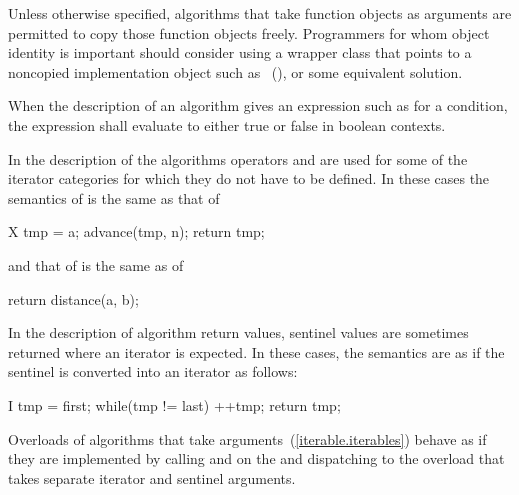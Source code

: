 \pnum
\enternote
Unless otherwise specified, algorithms that take function objects as arguments
are permitted to copy those function objects freely. Programmers for whom object
identity is important should consider using a wrapper class that points to a
noncopied implementation object such as ~(), or some equivalent solution.
\exitnote

\begin{removedblock}
\pnum
When the description of an algorithm gives an expression such as
for a condition, the expression shall evaluate to
either true or false in boolean contexts.
\end{removedblock}

\pnum
In the description of the algorithms operators
\tcode{+}
and
\tcode{-}
are used for some of the iterator categories for which
they do not have to be defined.
In these cases the semantics of
is the same as that of

\begin{codeblock}
X tmp = a;
advance(tmp, n);
return tmp;
\end{codeblock}

and that of
is the same as of

\begin{codeblock}
return distance(a, b);
\end{codeblock}

\begin{addedblock}
\pnum
In the description of algorithm return values, sentinel values are sometimes
returned where an iterator is expected. In these cases, the semantics are as
if the sentinel is converted into an iterator as follows:

\begin{codeblock}
I tmp = first;
while(tmp != last)
  ++tmp;
return tmp;
\end{codeblock}

\pnum
Overloads of algorithms that take  arguments~(\ref{iterable.iterables})
behave as if they are implemented by calling  and  on
the  and dispatching to the overload that takes separate
iterator and sentinel arguments.
\end{addedblock}



